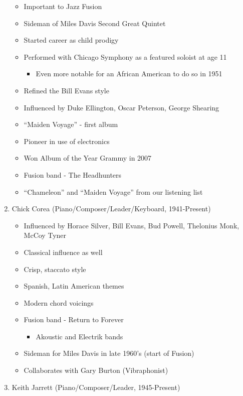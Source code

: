 \documentclass[]{article}
\providecommand{\tightlist}{%
  \setlength{\itemsep}{0pt}\setlength{\parskip}{0pt}}
\begin{document}
\begin{enumerate}
  \begin{itemize}
  \tightlist
  \item
    Important to Jazz Fusion
  \item
    Sideman of Miles Davis Second Great Quintet
  \item
    Started career as child prodigy
  \item
    Performed with Chicago Symphony as a featured soloist at age 11

    \begin{itemize}
    \tightlist
    \item
      Even more notable for an African American to do so in 1951
    \end{itemize}
  \item
    Refined the Bill Evans style
  \item
    Influenced by Duke Ellington, Oscar Peterson, George Shearing
  \item
    ``Maiden Voyage'' - first album
  \item
    Pioneer in use of electronics
  \item
    Won Album of the Year Grammy in 2007
  \item
    Fusion band - The Headhunters
  \item
    ``Chameleon'' and ``Maiden Voyage'' from our listening list
  \end{itemize}
\item
  Chick Corea (Piano/Composer/Leader/Keyboard, 1941-Present)

  \begin{itemize}
  \tightlist
  \item
    Influenced by Horace Silver, Bill Evans, Bud Powell, Thelonius Monk,
    McCoy Tyner
  \item
    Classical influence as well
  \item
    Crisp, staccato style
  \item
    Spanish, Latin American themes
  \item
    Modern chord voicings
  \item
    Fusion band - Return to Forever

    \begin{itemize}
    \tightlist
    \item
      Akoustic and Electrik bands
    \end{itemize}
  \item
    Sideman for Miles Davis in late 1960's (start of Fusion)
  \item
    Collaborates with Gary Burton (Vibraphonist)
  \end{itemize}
\item
  Keith Jarrett (Piano/Composer/Leader, 1945-Present)


\end{enumerate}
\end{document}
